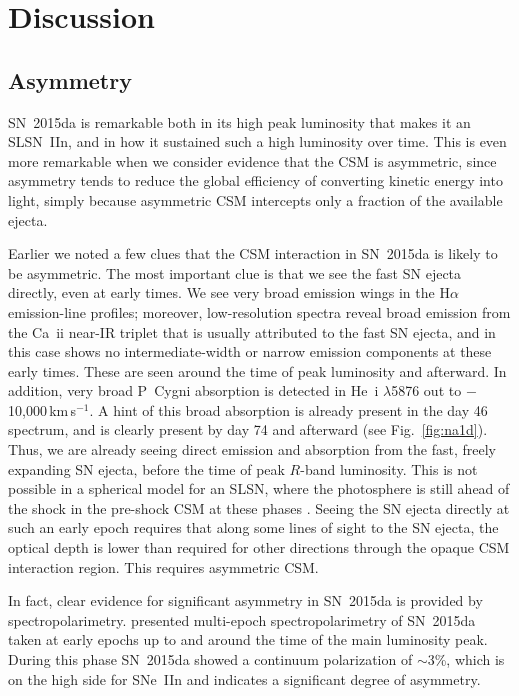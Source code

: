\documentclass[fleqn,usenatbib,useAMS]{mnras}
\begin{document}
\section{Discussion}

\subsection{Asymmetry}

SN~2015da is remarkable both in its high peak luminosity that makes it
an SLSN~IIn, and in how it sustained such a high luminosity over time.
This is even more remarkable when we consider evidence that the CSM is
asymmetric, since asymmetry tends to reduce the global efficiency of
converting kinetic energy into light, simply
because asymmetric CSM intercepts only a fraction of the available ejecta.

Earlier we noted a few clues that the CSM interaction in SN~2015da is
likely to be asymmetric.  The most important clue is that we see the
fast SN ejecta directly, even at early times.  We see very broad
emission wings in the H$\alpha$ emission-line profiles; moreover,
low-resolution spectra reveal broad emission from the Ca~{\sc ii} near-IR
triplet that is usually attributed to the fast SN ejecta, and in this case shows no intermediate-width or narrow emission components at these early times.  These are
seen around the time of peak luminosity and afterward.  In addition,
very broad P~Cygni absorption is detected in He~{\sc i} $\lambda$5876
out to $-$10,000\,km\,s$^{-1}$.  A hint of this broad absorption
is already present in the day 46 spectrum, and is clearly present by
day 74 and afterward (see Fig.~\ref{fig:na1d}).  Thus, we are
already seeing direct emission and absorption from the fast, freely
expanding SN ejecta, before the time of peak $R$-band luminosity.  This is
not possible in a spherical model for an SLSN, where the photosphere is
still ahead of the shock in the pre-shock CSM at these phases
\citep{dessart15,smith08tf,woosley07}.  Seeing the SN ejecta directly
at such an early epoch requires that along some lines of sight to the
SN ejecta, the optical depth is lower than required for other
directions through the opaque CSM interaction region.  This requires
asymmetric CSM.

In fact, clear evidence for significant asymmetry in SN~2015da is
provided by spectropolarimetry.  \citet{bilinski23} presented
multi-epoch spectropolarimetry of SN~2015da taken at early epochs up to
and around the time of the main luminosity peak.  During this phase
SN~2015da showed a continuum polarization of $\sim 3$\%, which is on
the high side for SNe~IIn and indicates a significant degree of
asymmetry.
\end{document}
